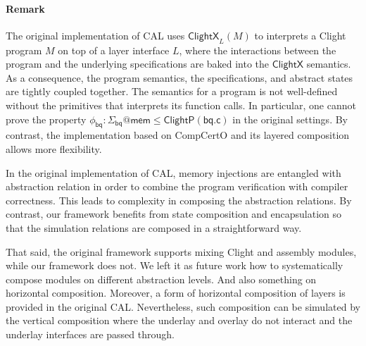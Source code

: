 \documentclass[acmsmall,screen,review,anonymous]{acmart}
\newcommand{\kw}[1]{\ensuremath{ \mathsf{#1} }}
\begin{document}
\paragraph{Remark}

The original implementation of CAL
uses $\kw{ClightX}_L(M)$
to interprets a Clight program $M$
on top of a layer interface $L$,
where the interactions
between the program and the underlying specifications
are baked into the $\kw{ClightX}$ semantics.
As a consequence,
the program semantics, the specifications,
and abstract states
are tightly coupled together.
The semantics for a program
is not well-defined
without the primitives that interprets its function calls.
In particular,
one cannot prove the property
$ \phi_\kw{bq}: \Sigma_\kw{bq}@\kw{mem} \le \kw{ClightP}(\kw{bq.c})$
in the original settings.
By contrast,
the implementation based on CompCertO
and its layered composition allows more flexibility.

In the original implementation of CAL,
memory injections are entangled with abstraction relation
in order to
combine the program verification with compiler correctness.
This leads to complexity in composing
the abstraction relations.
By contrast,
our framework benefits from
state composition and encapsulation
so that
the simulation relations are composed
in a straightforward way.

That said,
the original framework
supports mixing Clight and assembly modules,
while our framework does not.
We left it as future work how to
systematically compose modules
on different abstraction levels.
And also something on horizontal composition.
Moreover,
a form of horizontal composition of layers
is provided in the original CAL.
Nevertheless,
such composition can be simulated
by the vertical composition
where the underlay and overlay do not interact
and the underlay interfaces are passed through.

\end{document}
